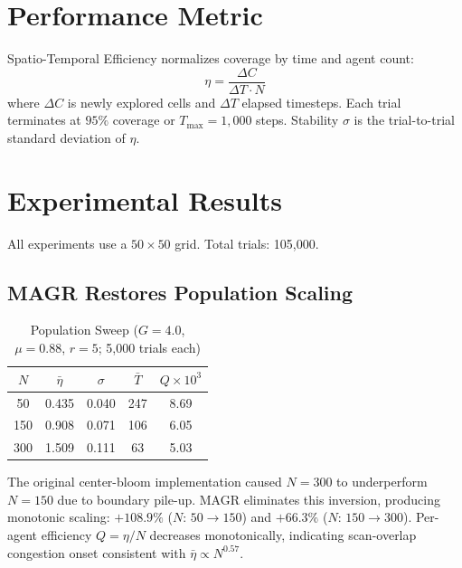 \documentclass[journal,twoside,letterpaper]{IEEEtran}
\begin{document}
\section{Performance Metric}

Spatio-Temporal Efficiency normalizes coverage by time and agent count:
\begin{equation}
    \eta = \frac{\Delta C}{\Delta T \cdot N}
    \label{eq:eta}
\end{equation}
where $\Delta C$ is newly explored cells and $\Delta T$ elapsed timesteps.
Each trial terminates at $95\%$ coverage or $T_{\max}=1{,}000$ steps.
Stability $\sigma$ is the trial-to-trial standard deviation of $\eta$.

\section{Experimental Results}

All experiments use a $50\times50$ grid. Total trials: 105,000.

\subsection{MAGR Restores Population Scaling}

\begin{table}[H]
\renewcommand{\arraystretch}{1.2}
\caption{Population Sweep ($G=4.0$, $\mu=0.88$, $r=5$; 5,000 trials each)}
\label{tab:nsweep}
\centering\small
\begin{tabular}{ccccc}
\toprule
$N$ & $\bar{\eta}$ & $\sigma$ & $\bar{T}$ & $Q\times10^3$ \\
\midrule
50  & 0.435 & 0.040 & 247 & 8.69 \\
150 & 0.908 & 0.071 & 106 & 6.05 \\
300 & 1.509 & 0.111 &  63 & 5.03 \\
\bottomrule
\end{tabular}
\end{table}

The original center-bloom implementation caused $N=300$ to underperform $N=150$
due to boundary pile-up. MAGR eliminates this inversion, producing monotonic
scaling: $+108.9\%$ ($N$: $50\to150$) and $+66.3\%$ ($N$: $150\to300$).
Per-agent efficiency $Q=\eta/N$ decreases monotonically, indicating scan-overlap
congestion onset consistent with $\bar{\eta}\propto N^{0.57}$.
\end{document}
